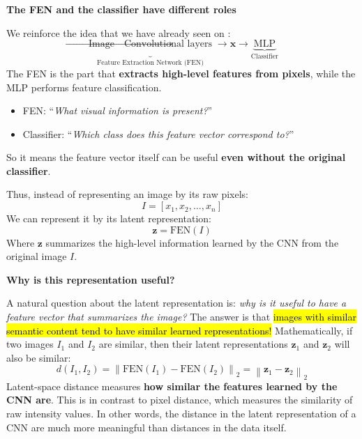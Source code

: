 \highspace
\begin{flushleft}
    \textcolor{Green3}{ \textbf{The FEN and the classifier have different roles}}
\end{flushleft}
We reinforce the idea that we have already seen on :
\begin{equation*}
    \underbrace{\text{Image} \to \text{Convolutional layers}}_{\text{Feature Extraction Network (FEN)}} \to \mathbf{x} \to \underbrace{\text{MLP}}_{\text{Classifier}}
\end{equation*}
The FEN is the part that \textbf{extracts high-level features from pixels}, while the MLP performs feature classification.
\begin{itemize}
    \item FEN: ``\emph{What visual information is present?}''
    \item Classifier: ``\emph{Which class does this feature vector correspond to?}''
\end{itemize}
So it means the feature vector itself can be useful \textbf{even without the original classifier}.

\highspace
Thus, instead of representing an image by its raw pixels:
\begin{equation*}
    I = \left[x_1, x_2, \ldots, x_n\right]
\end{equation*}
We can represent it by its latent representation:
\begin{equation*}
    \mathbf{z} = \mathrm{FEN}(I)
\end{equation*}
Where $\mathbf{z}$ summarizes the high-level information learned by the CNN from the original image $I$.

\highspace
\begin{flushleft}
    \textcolor{Green3}{ \textbf{Why is this representation useful?}}
\end{flushleft}
A natural question about the latent representation is: \emph{why is it useful to have a feature vector that summarizes the image?} The answer is that \hl{images with similar semantic content tend to have similar learned representations!} Mathematically, if two images $I_1$ and $I_2$ are similar, then their latent representations $\mathbf{z}_1$ and $\mathbf{z}_2$ will also be similar:
\begin{equation}\label{eq:latent-space-distance}
    d\left(I_1 , I_2\right) = \left\| \mathrm{FEN}\left(I_1\right) - \mathrm{FEN}\left(I_2\right) \right\|_{2} = \left\| \mathbf{z}_1 - \mathbf{z}_2 \right\|_2
\end{equation}
Latent-space distance measures \textbf{how similar the features learned by the CNN are}. This is in contrast to pixel distance, which measures the similarity of raw intensity values. In other words, the distance in the latent representation of a CNN are much more meaningful than distances in the data itself.

